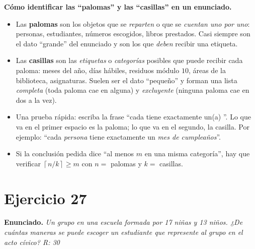 \documentclass[11pt]{article}
\begin{document}
\begin{tip}
\textbf{C\'omo identificar las ``palomas'' y las ``casillas'' en un enunciado.}
\begin{itemize}[leftmargin=*]
  \item Las \textbf{palomas} son los objetos que se \emph{reparten} o que se \emph{cuentan uno por uno}: personas, estudiantes, n\'umeros escogidos, libros prestados. Casi siempre son el dato ``grande'' del enunciado y son los que \emph{deben} recibir una etiqueta.
  \item Las \textbf{casillas} son las \emph{etiquetas} o \emph{categor\'ias} posibles que puede recibir cada paloma: meses del a\~no, d\'ias h\'abiles, residuos m\'odulo $10$, \'areas de la biblioteca, asignaturas. Suelen ser el dato ``peque\~no'' y forman una lista \emph{completa} (toda paloma cae en alguna) y \emph{excluyente} (ninguna paloma cae en dos a la vez).
  \item Una prueba r\'apida: escriba la frase ``cada \underline{\hspace{2.2cm}} tiene exactamente un(a) \underline{\hspace{2.2cm}}''. Lo que va en el primer espacio es la paloma; lo que va en el segundo, la casilla. Por ejemplo: ``cada \emph{persona} tiene exactamente un \emph{mes de cumplea\~nos}''.
  \item Si la conclusi\'on pedida dice ``al menos $m$ en una misma categor\'ia'', hay que verificar $\left\lceil n/k\right\rceil \ge m$ con $n=$ palomas y $k=$ casillas.
\end{itemize}
\end{tip}

\section*{Ejercicio 27}

\textbf{Enunciado.} \emph{Un grupo en una escuela formada por 17 ni\~nas y 13 ni\~nos. ¿De cu\'antas maneras se puede escoger un estudiante que represente al grupo en el acto c\'ivico? R: 30}
\end{document}
